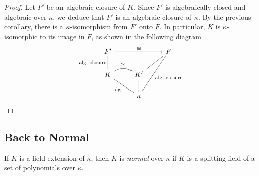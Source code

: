 \begin{proof}
    Let $F'$ be an algebraic closure of $K$. Since $F'$ is algebraically closed and algebraic over $\kappa$, we deduce that $F'$ is an algebraic closure of $\kappa$. By the previous corollary, there is a $\kappa$-isomorphism from $F'$ onto $F$. In particular, $K$ is $\kappa$-isomorphic to its image in $F$, as shown in the following diagram
        $$
        \begin{tikzcd}
            F'
                    \arrow[rr,"\cong"]
                &&F\\
            K
                    \arrow[r,"\cong",bend left]
                    \arrow[u,no head,"\text{\rm alg.~closure}"]
                &K'
                    \arrow[ru,no head]\\
                &\kappa
                    \arrow[lu,"\text{\rm alg.}",no head]
                    \arrow[u,no head,dashed]
                    \arrow[ruu,"\text{\rm alg.~closure}"',no head]
        \end{tikzcd}
    $$
\end{proof}


\subsection{Back to Normal}

\begin{defn}
    If\/ $K$ is a field extension of\/ $\kappa$, then $K$ is \textsl{normal} over\/ $\kappa$ if\/ $K$ is a splitting field of a set of polynomials over\/ $\kappa$. 
\end{defn}

